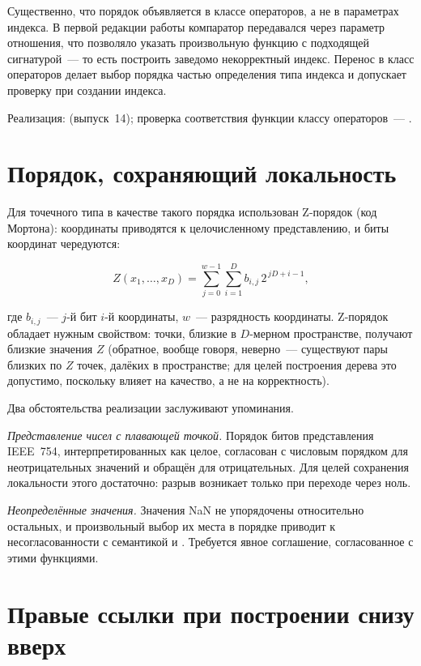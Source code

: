 Существенно, что порядок объявляется в классе операторов, а не в параметрах
индекса. В первой редакции работы компаратор передавался через параметр
отношения, что позволяло указать произвольную функцию с подходящей сигнатурой~---
то есть построить заведомо некорректный индекс. Перенос в класс операторов
делает выбор порядка частью определения типа индекса и допускает проверку при
создании индекса.

Реализация:  (выпуск~14); проверка соответствия функции классу операторов~---
.

\section{Порядок, сохраняющий локальность}

Для точечного типа в качестве такого порядка использован Z-порядок (код
Мортона): координаты приводятся к целочисленному представлению, и биты
координат чередуются:

\begin{equation}
\label{eq:zorder}
Z(x_1,\dots,x_D) = \sum_{j=0}^{w-1} \sum_{i=1}^{D} b_{i,j} \, 2^{\,jD + i - 1},
\end{equation}

где $b_{i,j}$~--- $j$-й бит $i$-й координаты, $w$~--- разрядность координаты.
Z-порядок обладает нужным свойством: точки, близкие в $D$-мерном пространстве,
получают близкие значения $Z$ (обратное, вообще говоря, неверно~--- существуют
пары близких по $Z$ точек, далёких в пространстве; для целей построения дерева
это допустимо, поскольку влияет на качество, а не на корректность).

Два обстоятельства реализации заслуживают упоминания.

\emph{Представление чисел с плавающей точкой.} Порядок битов представления
IEEE~754, интерпретированных как целое, согласован с числовым порядком для
неотрицательных значений и обращён для отрицательных. Для целей сохранения
локальности этого достаточно: разрыв возникает только при переходе через ноль.

\emph{Неопределённые значения.} Значения NaN не упорядочены относительно
остальных, и произвольный выбор их места в порядке приводит к несогласованности
с семантикой  и . Требуется явное соглашение,
согласованное с этими функциями.

\section{Правые ссылки при построении снизу вверх}

